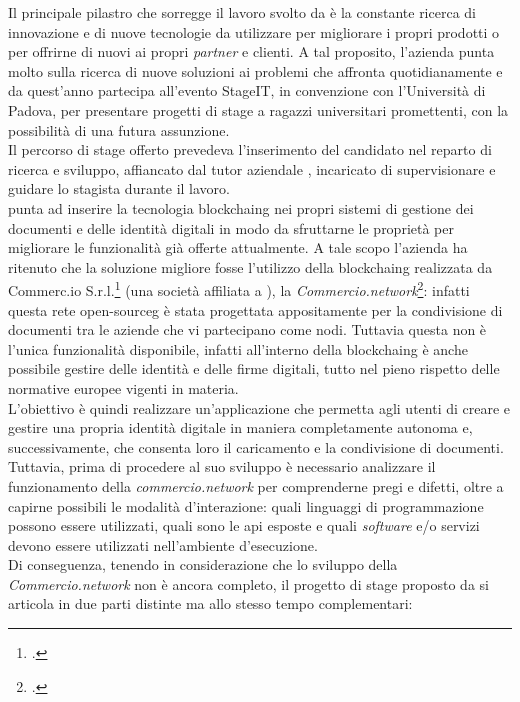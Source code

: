 Il principale pilastro che sorregge il lavoro svolto da \myCompany{} \companyTitle{} è la constante ricerca di innovazione e di nuove tecnologie da utilizzare per migliorare i propri prodotti o per offrirne di nuovi ai propri \textit{partner} e clienti. A tal proposito, l'azienda punta molto sulla ricerca di nuove soluzioni ai problemi che affronta quotidianamente e da quest'anno partecipa all'evento StageIT, in convenzione con l'Università di Padova, per presentare progetti di stage a ragazzi universitari promettenti, con la possibilità di una futura assunzione.\\
Il percorso di stage offerto prevedeva l'inserimento del candidato nel reparto di ricerca e sviluppo, affiancato dal tutor aziendale \myTutor, incaricato di supervisionare e guidare lo stagista durante il lavoro.\\
\myCompany{} \companyTitle{} punta ad inserire la tecnologia \gls{blockchaing}\glsfirstoccur{} nei propri sistemi di gestione dei documenti e delle identità digitali in modo da sfruttarne le proprietà per migliorare le funzionalità già offerte attualmente. A tale scopo l'azienda ha ritenuto che la soluzione migliore fosse l'utilizzo della \gls{blockchaing} realizzata da Commerc.io S.r.l.\footcite{site:commerc-io} (una società affiliata a \myCompany{} \companyTitle), la \textit{Commercio.network}\footcite{site:commercio-network}: infatti questa rete \gls{open-sourceg}\glsfirstoccur{} è stata progettata appositamente per la condivisione di documenti tra le aziende che vi partecipano come nodi. Tuttavia questa non è l'unica funzionalità disponibile, infatti all'interno della \gls{blockchaing} è anche possibile gestire delle identità e delle firme digitali, tutto nel pieno rispetto delle normative europee vigenti in materia.\\
L'obiettivo è quindi realizzare un'applicazione che permetta agli utenti di creare e gestire una propria identità digitale in maniera completamente autonoma e, successivamente, che consenta loro il caricamento e la condivisione di documenti. Tuttavia, prima di procedere al suo sviluppo è necessario analizzare il funzionamento della \textit{commercio.network} per comprenderne pregi e difetti, oltre a capirne possibili le modalità d'interazione: quali linguaggi di programmazione possono essere utilizzati, quali sono le \gls{api}\glsfirstoccur{} esposte e quali \textit{software} e/o servizi devono essere utilizzati nell'ambiente d'esecuzione.\\
Di conseguenza, tenendo in considerazione che lo sviluppo della \textit{Commercio.network} non è ancora completo, il progetto di stage proposto da \myCompany{} \companyTitle{} si articola in due parti distinte ma allo stesso tempo complementari:

